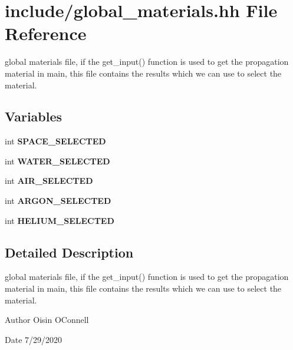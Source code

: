 \hypertarget{global__materials_8hh}{}\section{include/global\+\_\+materials.hh File Reference}
\label{global__materials_8hh}


global materials file, if the get\+\_\+input() function is used to get the propagation material in main, this file contains the results which we can use to select the material.  


\subsection*{Variables}
\begin{DoxyCompactItemize}
\item 
\mbox{\label{global__materials_8hh_a93d9d1add1c17e2ae9723c89f77f047f}} 
int {\bfseries S\+P\+A\+C\+E\+\_\+\+S\+E\+L\+E\+C\+T\+ED}
\item 
\mbox{\label{global__materials_8hh_af1d2cdb32af85fa8dcc407090d968c52}} 
int {\bfseries W\+A\+T\+E\+R\+\_\+\+S\+E\+L\+E\+C\+T\+ED}
\item 
\mbox{\label{global__materials_8hh_a2949513d4205c97accdb512267b16078}} 
int {\bfseries A\+I\+R\+\_\+\+S\+E\+L\+E\+C\+T\+ED}
\item 
\mbox{\label{global__materials_8hh_a74dc696d6118c25b84a895708dacf92a}} 
int {\bfseries A\+R\+G\+O\+N\+\_\+\+S\+E\+L\+E\+C\+T\+ED}
\item 
\mbox{\label{global__materials_8hh_a5791b97ab4cdc578a6e9f013484d87ac}} 
int {\bfseries H\+E\+L\+I\+U\+M\+\_\+\+S\+E\+L\+E\+C\+T\+ED}
\end{DoxyCompactItemize}


\subsection{Detailed Description}
global materials file, if the get\+\_\+input() function is used to get the propagation material in main, this file contains the results which we can use to select the material. 

\begin{DoxyAuthor}{Author}
Oisin O\textquotesingle{}Connell 
\end{DoxyAuthor}
\begin{DoxyDate}{Date}
7/29/2020 
\end{DoxyDate}
